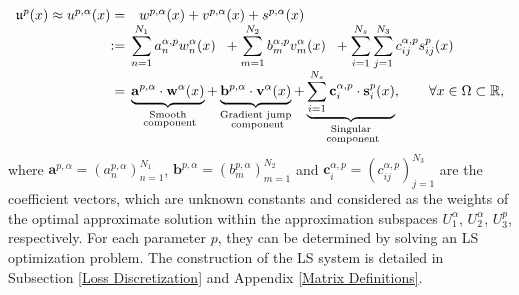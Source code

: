 \documentclass[oneside]{article}
\begin{document}
\begin{align}\label{eq2_LS-ReCoNN_solution_2D}
\begin{array}{rl}
     \mathfrak{u}^p(x) \approx u^{p, \alpha}(x) =&w^{p, \alpha}(x) + v^{p, \alpha}(x) + s^{p, \alpha}(x)\\:=&\hspace{-0.2cm} \displaystyle \sum_{n = 1}^{N_1} a^{\alpha, p}_n w^{\alpha}_n(x) \hspace{0.2cm} + \sum_{m = 1}^{N_2} b^{\alpha, p}_m v^{\alpha}_m(x) \hspace{0.2cm}+ \displaystyle \sum _{i=1}^{N_s}\sum _{j=1}^{N_3} {c_{ij}^{\alpha, p}} s_{ij}^{p}(x) \\[3mm]
     =& \hspace{-0.2cm} \displaystyle \underbrace{\mathbf{a}^{p,\alpha} \cdot \mathbf{w}^{\alpha}(x)}_{\substack{\text{Smooth}\\ \text{ component}}} + \underbrace{\mathbf{b}^{p,\alpha} \cdot \mathbf{v}^{\alpha}(x)}_{\substack{\text{Gradient jump}\\ \text{ component}}} +\underbrace{{\sum _{i=1}^{N_s}\mathbf{c}^{\alpha, p}_i} \cdot \mathbf{s}^{p}_i(x)}_{\substack{\text{Singular}\\ \text{ component}}}, \qquad \forall x \in \Omega \subset \mathbb{R}, \\[2mm]
\end{array}
\end{align}
where $\mathbf{a}^{p, \alpha} = (a_n^{p, \alpha})_{n=1}^{N_1}$, $\mathbf{b}^{p, \alpha} = (b_m^{p, \alpha})_{m=1}^{N_2}$ and {$\mathbf{c}^{\alpha, p}_i = (c_{ij}^{\alpha, p})_{j=1}^{N_3}$} are the coefficient vectors, which are unknown constants and considered as the weights of the optimal approximate solution within the approximation subspaces $U_1^\alpha$, $U_2^\alpha$, $U_3^p$, respectively. For each parameter $p$, they can be determined by solving an LS optimization problem. The construction of the LS system is detailed in Subsection \ref{Loss Discretization} and Appendix \ref{Matrix Definitions}.
\end{document}
